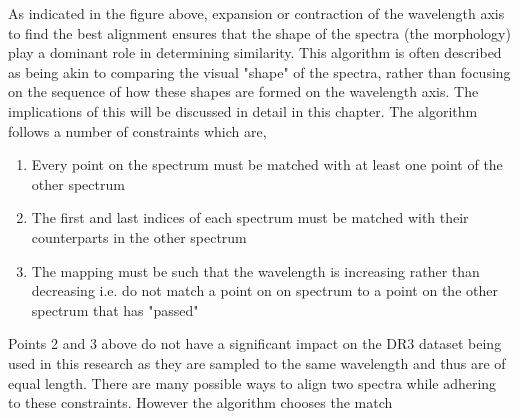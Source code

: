 As indicated in the figure above, expansion or contraction of the wavelength axis to find the best alignment ensures that the shape of the spectra (the morphology) play a dominant role in determining similarity. This algorithm is often described as being akin to comparing the visual "shape" of the spectra, rather than focusing on the sequence of how these shapes are formed on the wavelength axis. The implications of this will be discussed in detail in this chapter. The algorithm follows a number of constraints which are,

\begin{enumerate}
    \item Every point on the spectrum must be matched with at least one point of the other spectrum
    \item The first and last indices of each spectrum must be matched with their counterparts in the other spectrum
    \item The mapping must be such that the wavelength is increasing rather than decreasing i.e. do not match a point on on spectrum to a point on the other spectrum that has "passed"
\end{enumerate}

Points 2 and 3 above do not have a significant impact on the DR3 dataset being used in this research as they are sampled to the same wavelength and thus are of equal length. There are many possible ways to align two spectra while adhering to these constraints. However the algorithm chooses the match 

